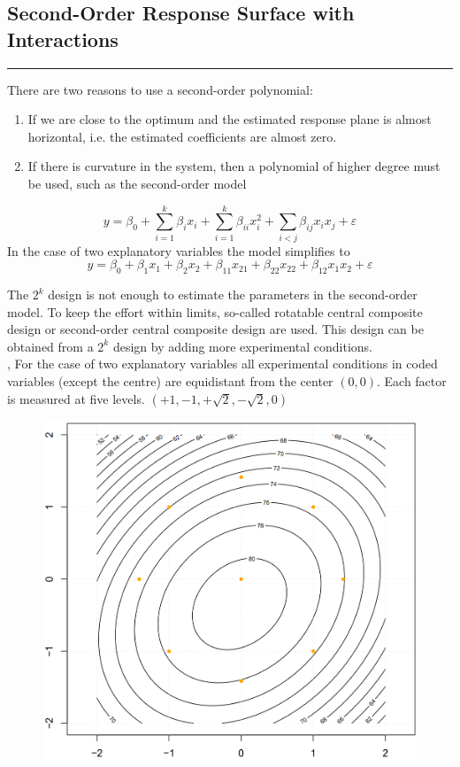\subsection{Second-Order Response Surface with Interactions}
\noindent\rule[\linienAbstand]{\linewidth}{\linienDicke}
There are two reasons to use a second-order polynomial:\\
\begin{enumerate}
  \item If we are close to the optimum and the estimated response plane is almost horizontal, i.e. the estimated coefficients are almost zero.\\
  \item If there is curvature in the system, then a polynomial of higher degree must be used, such as the second-order model
\end{enumerate}
\begin{equation}
  y = \beta_0 + \sum_{i=1}^k \beta_i x_i + \sum_{i=1}^k \beta_{ii} x_i^2 + \sum_{i<j} \beta_{ij} x_i x_j + \varepsilon
\end{equation}
In the case of two explanatory variables the model simplifies to
\begin{equation}
  y = \beta_0 + \beta_1 x_1 + \beta_2 x_2 + \beta_{11} x_{21} + \beta_{22}x_{22} + \beta_{12}x_1x_2 + \varepsilon
\end{equation}

The $2^k$ design is not enough to estimate the parameters in the second-order model. To keep the effort within limits, so-called rotatable central composite design or second-order central composite design are used. This design can be obtained from a $2^k$ design by adding more experimental conditions.\\,
For the case of two explanatory variables all experimental conditions in coded variables (except the centre) are equidistant from the center $(0, 0)$. Each factor is measured at five levels. $(+1, -1, +\sqrt{2}, -\sqrt{2}, 0)$
\begin{figure}[H]
  \centering
  \includegraphics[width=.6\linewidth]{Pics/15.2.1.png}
\end{figure}

